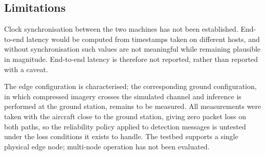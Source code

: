 \subsection{Limitations}
\label{sec:test-limitations}

Clock synchronisation between the two machines has not been established.
End-to-end latency would be computed from timestamps taken on different
hosts, and without synchronisation such values are not meaningful while
remaining plausible in magnitude. End-to-end latency is therefore not
reported, rather than reported with a caveat.

The edge configuration is characterised; the corresponding ground
configuration, in which compressed imagery crosses the simulated channel and
inference is performed at the ground station, remains to be measured. All
measurements were taken with the aircraft close to the ground station,
giving zero packet loss on both paths, so the reliability policy applied to
detection messages is untested under the loss conditions it exists to
handle. The testbed supports a single physical edge node; multi-node
operation has not been evaluated.

%
%
%
%
